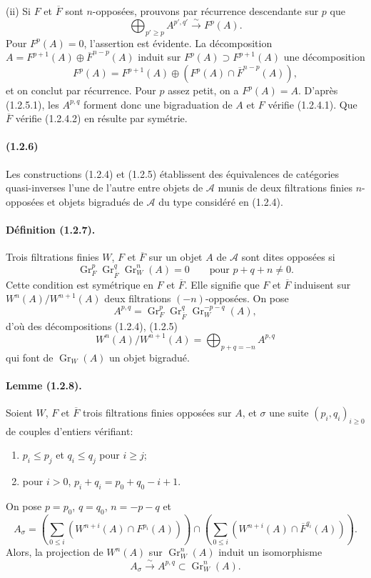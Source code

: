 \documentclass[10pt]{article}
\newcommand{\Gr}{\operatorname{Gr}}
\newcommand{\calA}{\mathcal A}
\newcommand{\iso}{\xrightarrow{\sim}}
\begin{document}
(ii) Si $F$ et $\overline F$ sont $n$-opposées, prouvons par récurrence descendante sur $p$ que
\[
\tag{1.2.5.1}
\bigoplus_{p'\ge p} A^{p',q'}\iso F^p(A).
\]
Pour $F^p(A)=0$, l'assertion est évidente. La décomposition $A=F^{p+1}(A)\oplus\overline F^{n-p}(A)$ induit sur $F^p(A)\supset F^{p+1}(A)$ une décomposition
\[
F^p(A)=F^{p+1}(A)\oplus(F^p(A)\cap\overline F^{n-p}(A)),
\]
et on conclut par récurrence. Pour $p$ assez petit, on a $F^p(A)=A$. D'après (1.2.5.1), les $A^{p,q}$ forment donc une bigraduation de $A$ et $F$ vérifie (1.2.4.1). Que $\overline F$ vérifie (1.2.4.2) en résulte par symétrie.

\paragraph{(1.2.6)} Les constructions (1.2.4) et (1.2.5) établissent des équivalences de catégories quasi-inverses l'une de l'autre entre objets de $\calA$ munis de deux filtrations finies $n$-opposées et objets bigradués de $\calA$ du type considéré en (1.2.4).

\paragraph{Définition (1.2.7).} Trois filtrations finies $W$, $F$ et $\overline F$ sur un objet $A$ de $\calA$ sont dites opposées si
\[
\Gr_F^p\Gr_{\overline F}^{q}\Gr_W^n(A)=0\qquad\text{pour }p+q+n\ne0.
\]
Cette condition est symétrique en $F$ et $\overline F$. Elle signifie que $F$ et $\overline F$ induisent sur $W^n(A)/W^{n+1}(A)$ deux filtrations $(-n)$-opposées. On pose
\[
A^{p,q}=\Gr_F^p\Gr_{\overline F}^{q}\Gr_W^{-p-q}(A),
\]
d'où des décompositions (1.2.4), (1.2.5)
\[
\tag{1.2.7.1}
W^n(A)/W^{n+1}(A)=\bigoplus_{p+q=-n}A^{p,q}
\]
qui font de $\Gr_W(A)$ un objet bigradué.

\paragraph{Lemme (1.2.8).} Soient $W$, $F$ et $\overline F$ trois filtrations finies opposées sur $A$, et $\sigma$ une suite $(p_i,q_i)_{i\ge0}$ de couples d'entiers vérifiant:
\begin{enumerate}[label=\alph*)]
\item $p_i\le p_j$ et $q_i\le q_j$ pour $i\ge j$;
\item pour $i>0$, $p_i+q_i=p_0+q_0-i+1$.
\end{enumerate}
On pose $p=p_0$, $q=q_0$, $n=-p-q$ et
\[
A_\sigma=\left(\sum_{0\le i} (W^{n+i}(A)\cap F^{p_i}(A))\right)
\cap
\left(\sum_{0\le i} (W^{n+i}(A)\cap \overline F^{q_i}(A))\right).
\]
Alors, la projection de $W^n(A)$ sur $\Gr_W^n(A)$ induit un isomorphisme
\[
A_\sigma\iso A^{p,q}\subset\Gr_W^n(A).
\]
\end{document}
